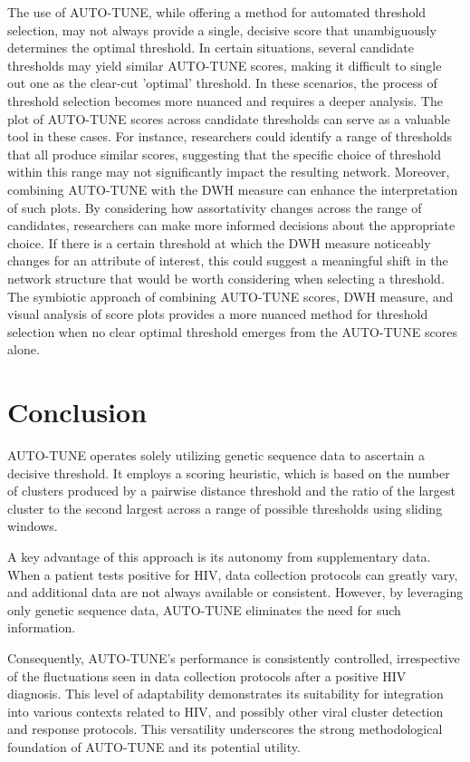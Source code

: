 \documentclass[utf8]{FrontiersinHarvard} %
\begin{document}
The use of AUTO-TUNE, while offering a method for automated threshold
selection, may not always provide a single, decisive score that unambiguously
determines the optimal threshold. In certain situations, several candidate
thresholds may yield similar AUTO-TUNE scores, making it difficult to single
out one as the clear-cut 'optimal' threshold. In these scenarios, the process
of threshold selection becomes more nuanced and requires a deeper analysis. The
plot of AUTO-TUNE scores across candidate thresholds can serve as a valuable
tool in these cases. For instance, researchers could identify a range of
thresholds that all produce similar scores, suggesting that the specific choice
of threshold within this range may not significantly impact the resulting
network. Moreover, combining AUTO-TUNE with the DWH measure can enhance the
interpretation of such plots. By considering how assortativity changes across
the range of candidates, researchers can make more informed decisions about the
appropriate choice. If there is a certain threshold at which the DWH measure
noticeably changes for an attribute of interest, this could suggest a
meaningful shift in the network structure that would be worth considering when
selecting a threshold. The symbiotic approach of combining AUTO-TUNE scores,
DWH measure, and visual analysis of score plots provides a more nuanced method
for threshold selection when no clear optimal threshold emerges from the
AUTO-TUNE scores alone. 

\section{Conclusion}

AUTO-TUNE operates solely utilizing genetic sequence data to ascertain a
decisive threshold. It employs a scoring heuristic, which is based on the number
of clusters produced by a pairwise distance threshold and the ratio of the
largest cluster to the second largest across a range of possible thresholds
using sliding windows.

A key advantage of this approach is its autonomy from supplementary data. When a
patient tests positive for HIV, data collection protocols can greatly vary, and
additional data are not always available or consistent. However, by leveraging
only genetic sequence data, AUTO-TUNE eliminates the need for such information.

Consequently, AUTO-TUNE's performance is consistently controlled, irrespective
of the fluctuations seen in data collection protocols after a positive HIV
diagnosis. This level of adaptability demonstrates its suitability for
integration into various contexts related to HIV, and possibly other viral
cluster detection and response protocols. This versatility underscores the
strong methodological foundation of AUTO-TUNE and its potential utility.
\end{document}
